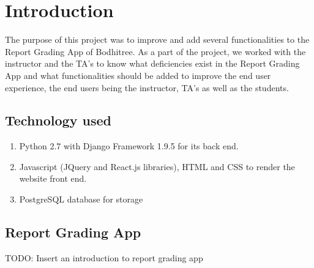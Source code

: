 \section{Introduction}
The purpose of this project was to improve and add several functionalities to the Report Grading App of Bodhitree. As a part of the project, we worked with the instructor and the TA’s to know what deficiencies exist in the Report Grading App and what functionalities should be added to improve the end user experience, the end users being the instructor, TA’s as well as the students.

\subsection{Technology used} %
\begin{enumerate}
\item Python 2.7 with Django Framework 1.9.5 for its back end.
\item Javascript (JQuery and React.js libraries), HTML and CSS to render the website front end.
\item PostgreSQL database for storage
\end{enumerate}

\subsection{Report Grading App}
TODO: Insert an introduction to report grading app
